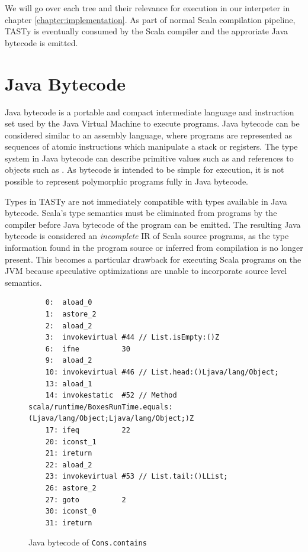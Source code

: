 We will go over each tree and their relevance for execution in our interpeter in chapter \ref{chapter:implementation}.
As part of normal Scala compilation pipeline, TASTy is eventually consumed by the Scala compiler and the approriate Java bytecode is emitted. 

\section{Java Bytecode}

Java bytecode is a portable and compact intermediate language and instruction set used by the Java Virtual Machine to execute programs.
Java bytecode can be considered similar to an assembly language, where programs are represented as sequences of atomic instructions which manipulate a stack or registers.
The type system in Java bytecode can describe primitive values such as  and references to objects such as .
As bytecode is intended to be simple for execution, it is not possible to represent polymorphic programs fully in Java bytecode.

Types in TASTy are not immediately compatible with types available in Java bytecode.
Scala's type semantics must be eliminated from programs by the compiler before Java bytecode of the program can be emitted.
The resulting Java bytecode is considered an \textit{incomplete} IR of Scala source programs, as the type information found in the program source or inferred from compilation is no longer present.
This becomes a particular drawback for executing Scala programs on the JVM because speculative optimizations are unable to incorporate source level semantics.

\begin{figure}[!htb]
	\begin{verbatim}
	0:  aload_0
 	1:  astore_2
	2:  aload_2
	3:  invokevirtual #44 // List.isEmpty:()Z
	6:  ifne          30
	9:  aload_2
	10: invokevirtual #46 // List.head:()Ljava/lang/Object;
	13: aload_1
	14: invokestatic  #52 // Method scala/runtime/BoxesRunTime.equals:(Ljava/lang/Object;Ljava/lang/Object;)Z
	17: ifeq          22
	20: iconst_1
	21: ireturn
	22: aload_2
	23: invokevirtual #53 // List.tail:()LList;
	26: astore_2
	27: goto          2
	30: iconst_0
	31: ireturn
	\end{verbatim}
	\caption{Java bytecode of \texttt{Cons.contains}}
	\label{example:contains-bytecode}
\end{figure}


